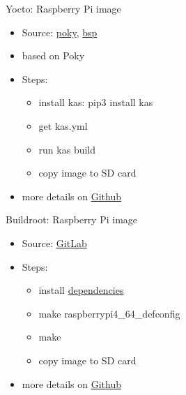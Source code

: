 \documentclass{beamer}
\begin{document}
\begin{frame}{Yocto: Raspberry Pi image}
	\begin{itemize}
		\item Source: \href{https://git.yoctoproject.org/poky}{poky}, \href{https://git.yoctoproject.org/meta-raspberrypi/}{bsp}
		\item based on Poky
		\item Steps:
		\begin{itemize}
			\item install kas: pip3 install kas
			\item get kas.yml
			\item run kas build
			\item copy image to SD card
		\end{itemize}
		\item more details on \href{https://github.com/tomirgang/eh21_maintainable_linux/tree/main/examples/first_build_rpi4/yocto}{Github}
	\end{itemize}
\end{frame}


\begin{frame}{Buildroot: Raspberry Pi image}
	\begin{itemize}
		\item Source: \href{https://gitlab.com/buildroot.org/buildroot/}{GitLab}
		\item Steps:
		\begin{itemize}
			\item install \href{https://buildroot.org/downloads/manual/manual.html\#requirement}{dependencies}
			\item make raspberrypi4\_64\_defconfig
			\item make
			\item copy image to SD card
		\end{itemize}
		\item more details on \href{https://github.com/tomirgang/eh21_maintainable_linux/tree/main/examples/first_build_rpi4/buildroot}{Github}
	\end{itemize}
\end{frame}
\end{document}

